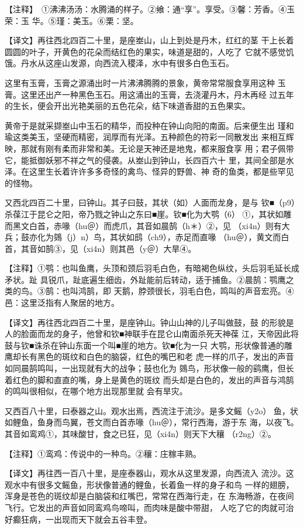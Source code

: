\documentclass[a4paper,12pt,UTF8,twoside]{ctexbook}
\begin{document}
【注释】　①沸沸汤汤：水腾涌的样子。②飨：通“享”。享受。③馨：芳香。④玉荣：玉 华。⑤瑾：美玉。⑥栗：坚。

【译文】再往西北四百二十里，是座峚山，山上到处是丹木，红红的茎 干上长着圆圆的叶子，开黄色的花朵而结红色的果实，味道是甜的，人吃了 它就不感觉饥饿。丹水从这座山发源，向西流入稷泽，水中有很多白色玉石。

这里有玉膏，玉膏之源涌出时一片沸沸腾腾的景象，黄帝常常服食享用这种 玉膏。这里还出产一种黑色玉石。用这涌出的玉膏，去浇灌丹木，丹木再经 过五年的生长，便会开出光艳美丽的五色花朵，结下味道香甜的五色果实。

黄帝于是就采撷峚山中玉石的精华，而投种在钟山向阳的南面。后来便生出 瑾和瑜这类美玉，坚硬而精密，润厚而有光泽。五种颜色的符彩一同散发出 来相互辉映，那就有刚有柔而非常和美。无论是天神还是地鬼，都来服食享 用；君子佩带它，能抵御妖邪不祥之气的侵袭。从峚山到钟山，长四百六十 里，其间全部是水泽。在这里生长着许许多多奇怪的禽鸟、怪异的野兽、神 奇的鱼类，都是些罕见的怪物。

又西北四百二十里，曰钟山。其子曰鼓，其状（如）人面而龙身，是与 钦■（p9）杀葆江于昆仑之阳，帝乃戮之钟山之东曰■崖。钦■化为大鹗（6） ①，其状如雕而黑文白首，赤喙（hu＠）而虎爪，其音如晨鹄（h＊）②，见 （xi4n）则有大兵；鼓亦化为鵕（j）n）鸟，其状如鸱（ch9），赤足而直喙 （hu＠），黄文而白首，其音如鹄③，见（xi4n）则其邑（y＠）大旱④。

【注释】①鹗：也叫鱼鹰，头顶和颈后羽毛白色，有暗褐色纵纹，头后羽毛延长成矛状。趾 具锐爪，趾底遍生细齿，外趾能前后转动，适于捕鱼。②晨鹄：鹗鹰之类的鸟。③鹄：也叫鸿鹄，即 天鹅，脖颈很长，羽毛白色，鸣叫的声音宏亮。④邑：这里泛指有人聚居的地方。

【译文】再往西北四百二十里，是座钟山。钟山山神的儿子叫做鼓，鼓 的形貌是人的脸面而龙的身子，他曾和钦■神联手在昆仑山南面杀死天神葆 江，天帝因此将鼓与钦■诛杀在钟山东面一个叫■崖的地方。钦■化为一只 大鹗，形状像普通的雕鹰却长有黑色的斑纹和白色的脑袋，红色的嘴巴和老 虎一样的爪子，发出的声音如同晨鹄鸣叫，一出现就有大的战争；鼓也化为 鵕鸟，形状像一般的鹞鹰，但长着红色的脚和直直的嘴，身上是黄色的斑纹 而头却是白色的，发出的声音与鸿鹄的鸣叫很相似，在哪个地方出现那里就 会有旱灾。

又西百八十里，曰泰器之山。观水出焉，西流注于流沙。是多文鳐（y2o） 鱼，状如鲤鱼，鱼身而鸟翼，苍文而白首赤喙（hu＠），常行西海，游于东 海，以夜飞。其音如鸾鸡①，其味酸甘，食之已狂，见（xi4n）则天下大穰 （r2ng）②。

【注释】①鸾鸡：传说中的一种鸟。②穰：庄稼丰熟。

【译文】再往西一百八十里，是座泰器山，观水从这里发源，向西流入 流沙。这观水中有很多文鳐鱼，形状像普通的鲤鱼，长着鱼一样的身子和鸟 一样的翅膀，浑身是苍色的斑纹却是白脑袋和红嘴巴，常常在西海行走，在 东海畅游，在夜间飞行。它发出的声音如同鸾鸡鸟啼叫，而肉味是酸中带甜， 人吃了它的肉就可治好癫狂病，一出现而天下就会五谷丰登。
\end{document}
